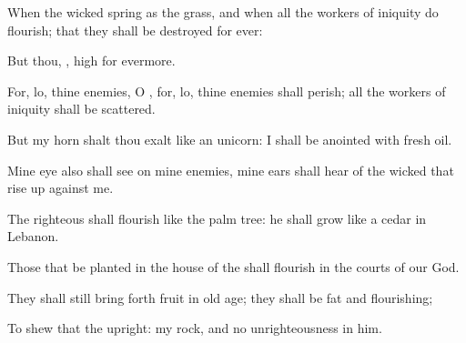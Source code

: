 {\Q {}When the
wicked
spring as the
grass, and when all the
workers of
iniquity do
flourish;
{} that they shall be
destroyed for
ever:


\par }{\Q {}But thou,
{},
{}
high for
evermore.


\par }{\Q {}For, lo, thine
enemies, O
{}, for, lo, thine
enemies shall
perish; all the
workers of
iniquity shall be
scattered.


\par }{\Q {}But my
horn shalt thou
exalt like
{} an
unicorn: I shall be
anointed with
fresh
oil.


\par }{\Q {}Mine
eye also shall
see
{} on mine
enemies,
{} mine
ears shall
hear
{} of the
wicked that rise
up against me.


\par }{\Q {}The
righteous shall
flourish like the palm
tree: he shall
grow like a
cedar in
Lebanon.


\par }{\Q {}Those that be
planted in the
house of the
{} shall
flourish in the
courts of our
God.


\par }{\Q {}They shall still bring forth
fruit in old
age; they shall be
fat and
flourishing;


\par }{\Q {}To
shew that the
{}
{}
upright:
{} my
rock, and
{} no
unrighteousness in him.




\par }
